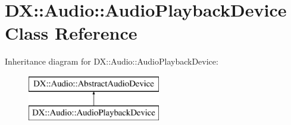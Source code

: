 \hypertarget{class_d_x_1_1_audio_1_1_audio_playback_device}{\section{D\-X\-:\-:Audio\-:\-:Audio\-Playback\-Device Class Reference}
\label{class_d_x_1_1_audio_1_1_audio_playback_device}
}
Inheritance diagram for D\-X\-:\-:Audio\-:\-:Audio\-Playback\-Device\-:\begin{figure}[H]
\begin{center}
\leavevmode
\includegraphics[height=2.000000cm]{class_d_x_1_1_audio_1_1_audio_playback_device}
\end{center}
\end{figure}
